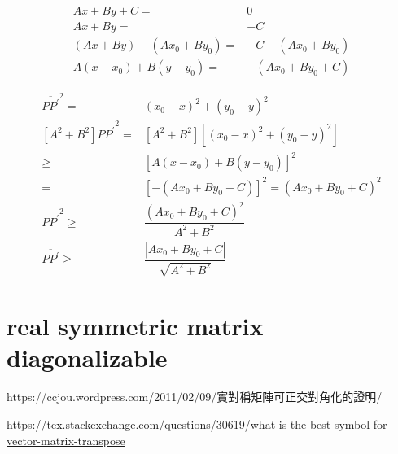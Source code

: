 \documentclass[
]{book}
\theoremstyle{definition}
\theoremstyle{definition}
\theoremstyle{definition}
\theoremstyle{definition}
\theoremstyle{remark}
\begin{document}
\[
\begin{aligned}
Ax+By+C= & 0\\
Ax+By= & -C\\
\left(Ax+By\right)-\left(Ax_{0}+By_{0}\right)= & -C-\left(Ax_{0}+By_{0}\right)\\
A\left(x-x_{0}\right)+B\left(y-y_{0}\right)= & -\left(Ax_{0}+By_{0}+C\right)
\end{aligned}
\]

\[
\begin{aligned}
\overline{PP^{\prime}}^{2}= & \left(x_{0}-x\right)^{2}+\left(y_{0}-y\right)^{2}\\
\left[A^{2}+B^{2}\right]\overline{PP^{\prime}}^{2}= & \left[A^{2}+B^{2}\right]\left[\left(x_{0}-x\right)^{2}+\left(y_{0}-y\right)^{2}\right]\\
\ge & \left[A\left(x-x_{0}\right)+B\left(y-y_{0}\right)\right]^{2}\\
= & \left[-\left(Ax_{0}+By_{0}+C\right)\right]^{2}=\left(Ax_{0}+By_{0}+C\right)^{2}\\
\overline{PP^{\prime}}^{2}\ge & \dfrac{\left(Ax_{0}+By_{0}+C\right)^{2}}{A^{2}+B^{2}}\\
\overline{PP^{\prime}}\ge & \dfrac{\left|Ax_{0}+By_{0}+C\right|}{\sqrt{A^{2}+B^{2}}}
\end{aligned}
\]

\hypertarget{real-symmetric-matrix-diagonalizable}{%
\chapter{real symmetric matrix diagonalizable}\label{real-symmetric-matrix-diagonalizable}}

\begin{CJK}{UTF8}{bsmi}
https://ccjou.wordpress.com/2011/02/09/實對稱矩陣可正交對角化的證明/
\end{CJK}

\url{https://tex.stackexchange.com/questions/30619/what-is-the-best-symbol-for-vector-matrix-transpose}
\end{document}
